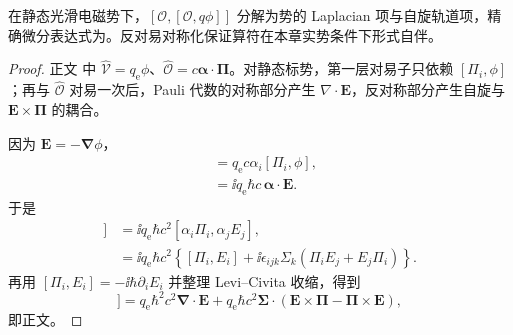 \begin{lemma}[静电势的双重交换子]
在静态光滑电磁势下，$[\mathcal O,[\mathcal O,q\phi]]$ 分解为势的 Laplacian 项与自旋轨道项，精确微分表达式为。反对易对称化保证算符在本章实势条件下形式自伴。
\end{lemma}
\begin{proof}
正文 中 $\hat{\mathcal V}=q_{\mathrm e}\phi$、$\hat{\mathcal O}=c\boldsymbol\alpha\cdot\boldsymbol\Pi$。对静态标势，第一层对易子只依赖 $[\Pi_i,\phi]$；再与 $\hat{\mathcal O}$ 对易一次后，Pauli 代数的对称部分产生 $\nabla\cdot\mathbf E$，反对称部分产生自旋与 $\mathbf E\times\boldsymbol\Pi$ 的耦合。

因为 $\mathbf E=-\boldsymbol\nabla\phi$，
\begin{align*}
 [\hat{\mathcal O},\hat{\mathcal V}]
 &=q_{\mathrm e} c\alpha_i[\Pi_i,\phi],\\
 &=\ii q_{\mathrm e}\hbar c\,\boldsymbol\alpha\cdot\mathbf E.
\end{align*}
于是
\begin{align*}
 [\hat{\mathcal O},[\hat{\mathcal O},\hat{\mathcal V}]]
 &=\ii q_{\mathrm e}\hbar c^2[\alpha_i\Pi_i,\alpha_jE_j],\\
 &=\ii q_{\mathrm e}\hbar c^2
 \left
 \{[\Pi_i,E_i]
 +\ii\epsilon_{ijk}\Sigma_k(\Pi_iE_j+E_j\Pi_i)
 \right\}.
\end{align*}
再用 $[\Pi_i,E_i]=-\ii\hbar\partial_iE_i$ 并整理 Levi--Civita 收缩，得到
\begin{equation*}
 [\hat{\mathcal O},[\hat{\mathcal O},\hat{\mathcal V}]]
 =q_{\mathrm e}\hbar^2c^2\boldsymbol\nabla\cdot\mathbf E
 +q_{\mathrm e}\hbar c^2\boldsymbol\Sigma\cdot
 \left(\mathbf E\times\boldsymbol\Pi-\boldsymbol\Pi\times\mathbf E\right),
\end{equation*}
即正文。
\end{proof}

